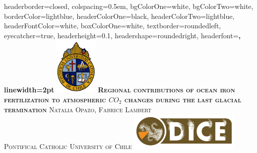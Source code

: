 \documentclass[landscape,a0paper,fontscale=0.33]{baposter} %
\begin{document}
\begin{poster}
{
headerborder=closed, %
colspacing=0.5em, %
bgColorOne=white, %
bgColorTwo=white, %
borderColor=lightblue, %
headerColorOne=black, %
headerColorTwo=lightblue, %
headerFontColor=white, %
boxColorOne=white, %
textborder=roundedleft, %
eyecatcher=true, %
headerheight=0.1\textheight, %
headershape=roundedright, %
headerfont=\Large\bf\textsc, %
linewidth=2pt %
}
%
{\includegraphics[height=7.5em]{LogoUC.png}} %
{\bf\textsc{Regional contributions of ocean iron fertilization to atmospheric $CO_2$ changes during the
last glacial termination}} %
{\textsc{Natalia Opazo, Fabrice Lambert \\
\hspace{12pt} Pontifical Catholic University of Chile}}%
{\includegraphics[height=5em]{DICE.png}} %



\end{poster}
\end{document}
